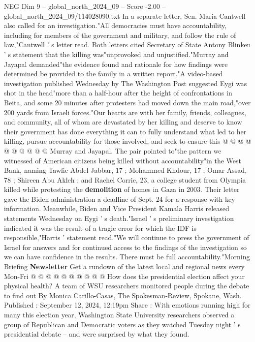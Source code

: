 \begin{textsample}{NEG Dim 9 – global\_north\_2024\_09 – Score -2.00 – global\_north\_2024\_09/114028090.txt}  \label{ex:f9_neg_210}
In a separate letter, Sen.
Maria Cantwell also called for an investigation."All democracies must have accountability, including for members of the government and military, and follow the rule of law,"Cantwell ' s letter read.
Both letters cited Secretary of State Antony Blinken ' s statement that the killing was"unprovoked and unjustified."Murray and Jayapal demanded"the evidence found and rationale for how findings were determined be provided to the family in a written report."A video-based investigation published Wednesday by The Washington Post suggested Eygi was shot in the head"more than a half-hour after the height of confrontations in Beita, and some 20 minutes after protesters had moved down the main road,"over 200 yards from Israeli forces."Our hearts are with her family, friends, colleagues, and community, all of whom are devastated by her killing and deserve to know their government has done everything it can to fully understand what led to her killing, pursue accountability for those involved, and seek to ensure this @ @ @ @ @ @ @ @ @ @ Murray and Jayapal.
The pair pointed to"the pattern we witnessed of American citizens being killed without accountability"in the West Bank, naming Tawfic Abdel Jabbar, 17 ; Mohammed Khdour, 17 ; Omar Assad, 78 ; Shireen Abu Akleh ; and Rachel Corrie, 23, a college student from Olympia killed while protesting the \textbf{demolition} of homes in Gaza in 2003.
Their letter gave the Biden administration a deadline of Sept. 24 for a response with key information.
Meanwhile, Biden and Vice President Kamala Harris released statements Wednesday on Eygi ' s death."Israel ' s preliminary investigation indicated it was the result of a tragic error for which the IDF is responsible,"Harris ' statement read."We will continue to press the government of Israel for answers and for continued access to the findings of the investigation so we can have confidence in the results.
There must be full accountability."Morning Briefing \textbf{Newsletter} Get a rundown of the latest local and regional news every Mon-Fri @ @ @ @ @ @ @ @ @ @ How does the presidential election affect your physical health?
A team of WSU researchers monitored people during the debate to find out By Monica Carillo-Casas, The Spokesman-Review, Spokane, Wash.
Published : September 12, 2024, 12:19pm Share : With emotions running high for many this election year, Washington State University researchers observed a group of Republican and Democratic voters as they watched Tuesday night ' s presidential debate -- and were surprised by what they found.

\end{textsample}
